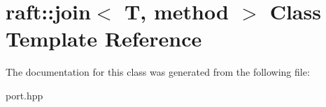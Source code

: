 \hypertarget{classraft_1_1join}{}\section{raft\+:\+:join$<$ T, method $>$ Class Template Reference}
\label{classraft_1_1join}


The documentation for this class was generated from the following file\+:\begin{DoxyCompactItemize}
\item 
port.\+hpp\end{DoxyCompactItemize}
